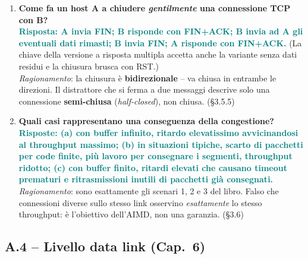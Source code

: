 \documentclass[12pt, a4paper]{article}
\begin{document}
\begin{enumerate}[leftmargin=*, resume]
\item \textbf{Come fa un host A a chiudere \emph{gentilmente} una connessione TCP con B?}\\
\textcolor{teal}{\textbf{Risposta: A invia FIN; B risponde con FIN+ACK; B invia ad A gli eventuali dati rimasti; B invia FIN; A risponde con FIN+ACK.}} (La chiave della versione a risposta multipla accetta anche la variante senza dati residui e la chiusura brusca con RST.)\\
\textit{Ragionamento}: la chiusura è \textbf{bidirezionale} -- va chiusa in entrambe le direzioni. Il distrattore che si ferma a due messaggi descrive solo una connessione \textbf{semi-chiusa} (\textit{half-closed}), non chiusa. (\S3.5.5)

\item \textbf{Quali casi rappresentano una conseguenza della congestione?}\\
\textcolor{teal}{\textbf{Risposte: (a) con buffer infinito, ritardo elevatissimo avvicinandosi al throughput massimo; (b) in situazioni tipiche, scarto di pacchetti per code finite, più lavoro per consegnare i segmenti, throughput ridotto; (c) con buffer finito, ritardi elevati che causano timeout prematuri e ritrasmissioni inutili di pacchetti già consegnati.}}\\
\textit{Ragionamento}: sono esattamente gli scenari 1, 2 e 3 del libro. \textcolor{red!70!black}{Falso} che connessioni diverse sullo stesso link osservino \emph{esattamente} lo stesso throughput: è l'obiettivo dell'AIMD, non una garanzia. (\S3.6)

\end{enumerate}

\subsection*{A.4 -- Livello data link (Cap.\ 6)}
\end{document}

